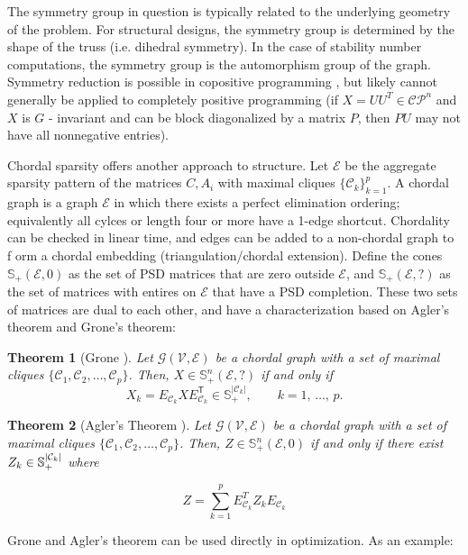 \documentclass{article}
\newcommand{\tr}{{\mathsf T}}
\DeclarePairedDelimiter{\abs}{\lvert}{\rvert}
\newcommand{\es}{\mathcal{E}}
\newcommand{\psd}{\mathbb{S}}
\newcommand{\cs}{\mathcal{C}}
\newcommand{\cp}{\mathcal{C}\mathcal{P}}
\newtheorem{theorem}{Theorem}
\begin{document}
The symmetry group in question is typically related to the underlying geometry of the problem. For structural designs, the symmetry group is determined by the shape of the truss (i.e. dihedral symmetry). In the case of stability number computations, the symmetry group is the automorphism group of the graph. Symmetry reduction is possible in copositive programming \cite{dobre2015exploiting}, but likely cannot generally be applied to completely positive programming (if $X = U U^T \in \cp^n$ and $X$ is $G$ - invariant and can be block diagonalized by a matrix $P$, then $PU$ may not have all nonnegative entries).

Chordal sparsity offers another approach to structure. Let $\es$ be the aggregate sparsity pattern of the matrices $C, A_i$ with maximal cliques $\{\cs_k\}_{k=1}^p$. A chordal graph is a graph $\es$ in which there exists a perfect elimination ordering; equivalently all cylces or length four or more have a 1-edge shortcut. Chordality can be checked in linear time, and edges can be added to a non-chordal graph to f orm a chordal embedding (triangulation/chordal extension). Define the cones $\psd_+(\es, 0)$ as the set of PSD matrices that are zero outside $\es$, and $\psd_+(\es, ?)$ as the set of matrices with entires on $\es$ that have a PSD completion. These two sets of matrices are dual to each other, and have a characterization based on Agler's  theorem and Grone's theorem:

 \begin{theorem} [Grone \cite{grone1984positive}] \label{T:GroneTheorem}
     Let $\mathcal{G}(\mathcal{V},\mathcal{E})$ be a chordal graph with a set of maximal cliques $\{\mathcal{C}_1,\mathcal{C}_2, \ldots, \mathcal{C}_p\}$. Then, $X\in\mathbb{S}^n_+(\mathcal{E},?)$ if and only if
     $$ X_k = E_{\mathcal{C}_k} X E_{\mathcal{C}_k}^\tr \in \mathbb{S}^{\vert \mathcal{C}_k \vert}_+,
    \qquad k=1,\,\ldots,\,p.$$
    \end{theorem}

\begin{theorem} [Agler's Theorem {\cite{agler}}] \label{T:ChordalConstructionTheorem}
     Let $\mathcal{G}(\mathcal{V},\mathcal{E})$ be a chordal graph with a set of maximal cliques $\{\mathcal{C}_1,\mathcal{C}_2, \ldots, \mathcal{C}_p\}$. Then, $Z\in\mathbb{S}^n_+(\mathcal{E},0)$ if and only if there exist $Z_k \in \psd_+^{\abs{\cs_k}} $ where  
    \end{theorem}
$$ Z = \sum_{k=1}^p{E^T_{\mathcal{C}_k} Z_k E_{\mathcal{C}_k} }$$

Grone and Agler's theorem can be used directly in optimization. As an example: 
\end{document}
